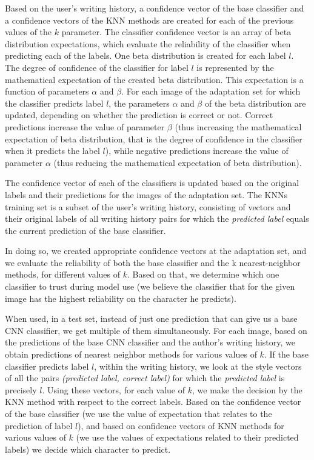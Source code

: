 \documentclass{article}
\begin{document}
Based on the user's writing history, a confidence vector of the base classifier and a confidence vectors of the KNN methods are created for each of the previous values of the $k$ parameter. 
The classifier confidence vector is an array of beta distribution expectations, which evaluate the reliability of the classifier when predicting each of the labels. 
One beta distribution is created for each label $l$. 
The degree of confidence of the classifier for label $l$ is represented by the mathematical expectation of the created beta distribution. 
This expectation is a function of parameters $\alpha$  and $\beta$. 
For each image of the adaptation set for which the classifier predicts label $l$, the parameters $\alpha$  and $\beta$ of the beta distribution are updated, depending on whether the prediction is correct or not. 
Correct predictions increase the value of parameter $\beta$ 
(thus increasing the mathematical expectation of beta distribution, that is the degree of confidence in the classifier when it predicts the label $l$), 
while negative predictions increase the value of parameter $\alpha$ 
(thus reducing the mathematical expectation of beta distribution). 

The confidence vector of each of the classifiers is updated based on the original labels and their predictions for the images of the adaptation set. 
The KNNs training set is a subset of the user's writing history, consisting of vectors and their original labels of all writing history pairs for 
which the \textit{predicted label} equals the current prediction of the base classifier. 

In doing so, we created appropriate confidence vectors at the adaptation set, and we evaluate the reliability of both the base classifier and the k nearest-neighbor methods, for different values of $k$. 
Based on that, we determine which one classifier to trust during model use (we believe the classifier that for the given image has the highest reliability on the character he predicts). 

When used, in a test set, instead of just one prediction that can give us a base CNN classifier, we get multiple of them simultaneously. 
For each image, based on the predictions of the base CNN classifier and the author's writing history, we obtain predictions of nearest neighbor methods for various values of $k$. 
If the base classifier predicts label $l$, within the writing history, we look at the style vectors of all the pairs \textit{(predicted label, correct label)} for which the \textit{predicted label} is precisely $l$. 
Using these vectors, for each value of $k$, we make the decision by the KNN method with respect to the correct labels. 
Based on the confidence vector of the base classifier (we use the value of expectation that relates to the prediction of label $l$), and based on confidence vectors of KNN methods for various values of $k$ 
(we use the values of expectations related to their predicted labels) we decide which character to predict. 
\end{document}
